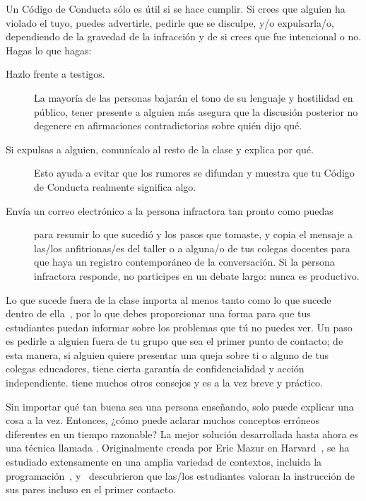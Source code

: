 Un Código de Conducta sólo es útil si se hace cumplir.
Si crees que alguien ha violado el tuyo,
puedes advertirle,
pedirle que se disculpe,
y/o expulsarla/o,
dependiendo de la gravedad de la infracción y de si crees que fue intencional o no.
Hagas lo que hagas:

\begin{description}

\item[Hazlo frente a testigos.]
  La mayoría de las personas bajarán el tono de su lenguaje y hostilidad en público,
  tener presente a alguien más asegura que
  la discusión posterior no degenere en afirmaciones contradictorias sobre quién dijo qué.

\item[Si expulsas a alguien, comunícalo al resto de la clase y explica por qué.]
  Esto ayuda a evitar que los rumores se difundan
  y muestra que tu Código de Conducta realmente significa algo.

\item[Envía un correo electrónico a la persona infractora tan pronto como puedas]
  para resumir lo que sucedió y los pasos que tomaste,
  y copia el mensaje a las/los anfitrionas/es del taller o a alguna/o de tus colegas docentes
  para que haya un registro contemporáneo de la conversación.
  Si la persona infractora responde,
  no participes en un debate largo:
  nunca es productivo.
\end{description}

Lo que sucede fuera de la clase importa al menos tanto como lo que sucede dentro de ella~\cite{Part2011},
por lo que debes proporcionar una forma para que tus estudiantes puedan informar sobre los problemas que tú no puedes ver.
Un paso es pedirle a alguien fuera de tu grupo que sea el primer punto de contacto;
de esta manera,
si alguien quiere presentar una queja sobre ti o alguno de tus colegas educadores,
tiene cierta garantía de confidencialidad y acción independiente.
\cite{Auro2019} tiene muchos otros consejos
y es a la vez breve y práctico.


Sin importar qué tan buena sea una persona enseñando,
solo puede explicar una cosa a la vez.
Entonces, ¿cómo puede aclarar muchos conceptos erróneos diferentes en un tiempo razonable?
La mejor solución desarrollada hasta ahora es una técnica llamada .
Originalmente creada por Eric Mazur en Harvard~\cite{Mazu1996},
se ha estudiado extensamente en una amplia variedad de contextos,
incluida la programación~\cite{Crou2001,Port2013},
y~\cite{Port2016} descubrieron que las/los estudiantes valoran la instrucción de sus pares incluso en el primer contacto.

